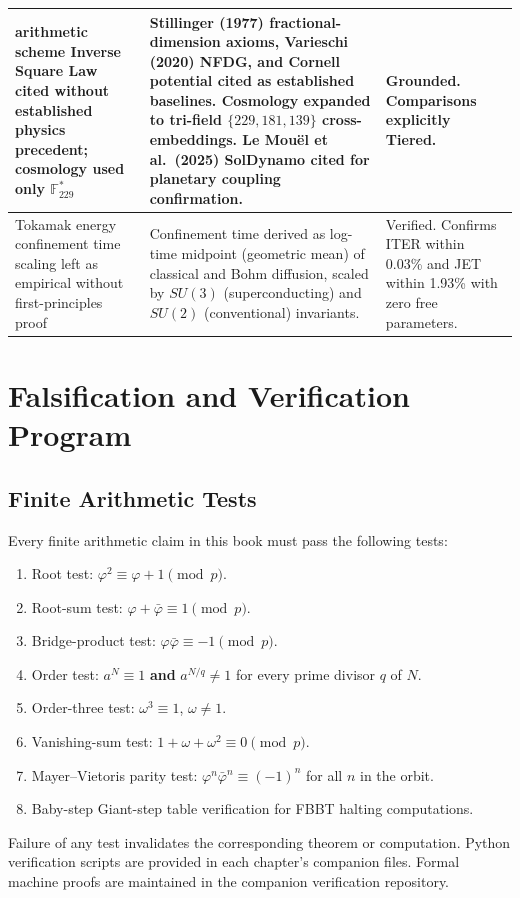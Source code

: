 \documentclass[12pt,oneside]{book}
\theoremstyle{principia}
\theoremstyle{definition}
\theoremstyle{remark}
\providecommand{\vp}{\varphi}
\providecommand{\vpbar}{\bar{\varphi}}
\begin{document}
\begin{center}
\begin{tabular}{@{}p{4cm}p{5cm}p{4cm}@{}}
\midrule
arithmetic scheme Inverse Square Law cited without established physics precedent; cosmology used only $\mathbb{F}_{229}^*$ & Stillinger (1977) fractional-dimension axioms, Varieschi (2020) NFDG, and Cornell potential cited as established baselines. Cosmology expanded to tri-field $\{229, 181, 139\}$ cross-embeddings. Le Mouël et al.\ (2025) SolDynamo cited for planetary coupling confirmation. & Grounded. Comparisons explicitly Tiered. \\
\midrule
Tokamak energy confinement time scaling left as empirical without first-principles proof & Confinement time derived as log-time midpoint (geometric mean) of classical and Bohm diffusion, scaled by $SU(3)$ (superconducting) and $SU(2)$ (conventional) invariants. & Verified. Confirms ITER within 0.03\% and JET within 1.93\% with zero free parameters. \\
\bottomrule
\end{tabular}
\end{center}

\section{Falsification and Verification Program}

\subsection{Finite Arithmetic Tests}
Every finite arithmetic claim in this book must pass the following tests:
\begin{enumerate}[label=A\arabic*., noitemsep]
\item Root test: $\vp^2 \equiv \vp + 1 \pmod{p}$.
\item Root-sum test: $\vp + \vpbar \equiv 1 \pmod{p}$.
\item Bridge-product test: $\vp \vpbar \equiv -1 \pmod{p}$.
\item Order test: $a^N \equiv 1$ \textbf{and} $a^{N/q} \neq 1$ for every prime divisor $q$ of $N$.
\item Order-three test: $\omega^3 \equiv 1$, $\omega \neq 1$.
\item Vanishing-sum test: $1 + \omega + \omega^2 \equiv 0 \pmod{p}$.
\item Mayer--Vietoris parity test: $\vp^n \vpbar^n \equiv (-1)^n$ for all $n$ in the orbit.
\item Baby-step Giant-step table verification for FBBT halting computations.
\end{enumerate}
\noindent Failure of any test invalidates the corresponding theorem or computation. Python verification scripts are provided in each chapter's companion files. Formal machine proofs are maintained in the companion verification repository.
\end{document}
